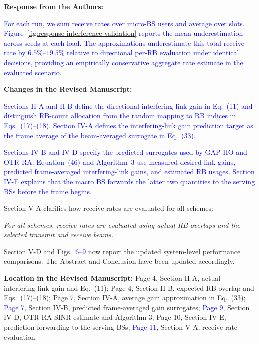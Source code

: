 \documentclass[11pt]{article}
\newenvironment{reviewedit}[1]
{\colorlet{responseblue}{#1}\colorlet{changeblue}{#1}\color{#1}}
{}
\newenvironment{authorresponse}
{\par\Needspace{3\baselineskip}\noindent\textcolor{responseblue}{\textbf{Response from the Authors:}}\par\nobreak\color{responseblue}}
{\par}
\newenvironment{manuscriptchanges}
{\par\noindent\textcolor{changeblue}{\textbf{Changes in the Revised Manuscript:}}\par\color{changeblue}}
{\par}
\newcommand{\revisionlocation}[1]{%
  \par\noindent\textbf{Location in the Revised Manuscript:} #1\par
}
\begin{document}
\begin{reviewedit}{blue}
\begin{authorresponse}
\textcolor{blue}{For each run, we sum receive rates over micro-BS users and
average over slots. Figure~\ref{fig:response-interference-validation}
reports the mean underestimation across seeds at each load. The
approximations underestimate this total receive rate by
$6.5\%$--$19.5\%$ relative to directional per-RB evaluation under identical
decisions, providing an empirically conservative aggregate rate estimate
in the evaluated scenario.}
\end{authorresponse}
\begin{manuscriptchanges}
\textcolor{blue}{Sections II-A and II-B define the directional interfering-link
gain in Eq.~(11) and distinguish RB-count allocation from the random mapping
to RB indices in Eqs.~(17)--(18). Section IV-A defines the interfering-link
gain prediction target as the frame average of the beam-averaged surrogate in Eq.~(33).}

\textcolor{blue}{Sections IV-B and IV-D specify the predicted surrogates used
by GAP-HO and OTR-RA. Equation~(46) and Algorithm~3 use measured desired-link
gains, predicted frame-averaged interfering-link gains, and estimated RB
usages. Section IV-E explains that the macro BS forwards the latter two
quantities to the serving BSs before the frame begins.}

Section V-A clarifies how receive rates are evaluated for all schemes:

\emph{For all schemes, receive rates are evaluated using actual RB overlaps and the selected transmit and receive beams.}

Section V-D and Figs.~\textcolor{blue}{6--9} now report the updated system-level performance
comparisons. The Abstract and Conclusion have been updated accordingly.
\end{manuscriptchanges}
\revisionlocation{Page 4, Section II-A, actual interfering-link gain and Eq.~(11);
Page 4, Section II-B, expected RB overlap and Eqs.~(17)--(18);
Page 7, Section IV-A, average gain approximation in Eq.~(33);
\textcolor{blue}{Page 7}, Section IV-B, predicted frame-averaged gain surrogates;
\textcolor{blue}{Page 9}, Section IV-D, OTR-RA SINR estimate and Algorithm 3;
Page 10, Section IV-E, prediction forwarding to the serving BSs;
\textcolor{blue}{Page 11}, Section V-A, receive-rate evaluation.}

\end{reviewedit}
\end{document}
